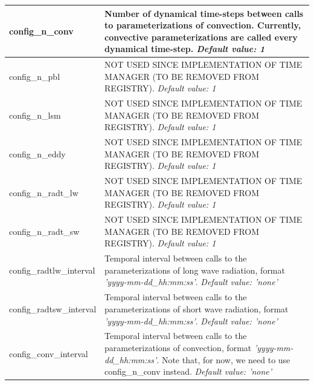 \documentclass[11pt]{report}
\begin{document}
{\begin{longtable}{|p{2.0in} |p{4.25in}|}
  config\_n\_conv & Number of dynamical time-steps between calls to parameterizations of convection. Currently, convective parameterizations  are called every dynamical time-step. \newline 
  {\em Default value: 1} \\ \hline  
  
  config\_n\_pbl & NOT USED SINCE IMPLEMENTATION OF TIME MANAGER (TO BE REMOVED FROM REGISTRY). \newline 
  {\em Default value: 1} \\ \hline
  
 config\_n\_lsm & NOT USED SINCE IMPLEMENTATION OF TIME MANAGER (TO BE REMOVED FROM REGISTRY). \newline 
  {\em Default value: 1} \\ \hline  
  
  config\_n\_eddy & NOT USED SINCE IMPLEMENTATION OF TIME MANAGER (TO BE REMOVED FROM REGISTRY). \newline 
  {\em Default value: 1} \\ \hline
  
  config\_n\_radt\_lw & NOT USED SINCE IMPLEMENTATION OF TIME MANAGER (TO BE REMOVED FROM REGISTRY). \newline 
  {\em Default value: 1} \\ \hline  
  
  config\_n\_radt\_sw & NOT USED SINCE IMPLEMENTATION OF TIME MANAGER (TO BE REMOVED FROM REGISTRY). \newline 
  {\em Default value: 1} \\ \hline
      
  config\_radtlw\_interval & Temporal interval between calls to the parameterizations of long wave radiation, format {\em 'yyyy-mm-dd\_hh:mm:ss'}. \newline 
  {\em Default value: 'none'} \\ \hline

  config\_radtsw\_interval & Temporal interval between calls to the parameterizations of short wave radiation, format {\em 'yyyy-mm-dd\_hh:mm:ss'}. \newline 
  {\em Default value: 'none'} \\ \hline

 config\_conv\_interval & Temporal interval between calls to the parameterizations of convection, format {\em 'yyyy-mm-dd\_hh:mm:ss'}. Note that, for now, we need to use config\_n\_conv instead. \newline
  {\em Default value: 'none'} \\ \hline


\end{longtable}}
\end{document}
